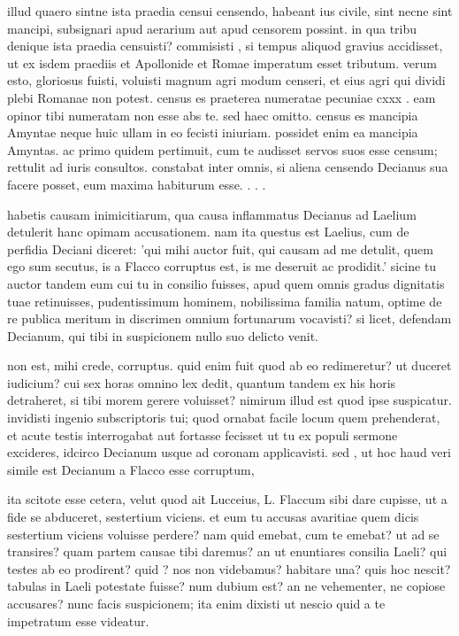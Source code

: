 illud quaero sintne ista praedia censui censendo, habeant ius civile, sint necne sint mancipi, subsignari apud aerarium aut apud censorem possint. in qua tribu denique ista praedia censuisti? commisisti , si tempus aliquod gravius accidisset, ut ex isdem praediis et Apollonide et Romae imperatum esset tributum. verum esto, gloriosus fuisti, voluisti magnum agri modum censeri, et eius agri qui dividi plebi Romanae non potest. census es praeterea numeratae pecuniae cxxx . eam opinor tibi numeratam non esse abs te. sed haec omitto. census es mancipia Amyntae neque huic ullam in eo fecisti iniuriam. possidet enim ea mancipia Amyntas. ac primo quidem pertimuit, cum te audisset servos suos esse censum; rettulit ad iuris consultos. constabat inter omnis, si aliena censendo Decianus sua facere posset, eum maxima habiturum esse. . . .

 habetis causam inimicitiarum, qua causa inflammatus Decianus ad Laelium detulerit hanc opimam accusationem. nam ita questus est Laelius, cum de perfidia Deciani diceret: 'qui mihi auctor fuit, qui causam ad me detulit, quem ego sum secutus, is a Flacco corruptus est, is me deseruit ac prodidit.' sicine tu auctor tandem eum cui tu in consilio fuisses, apud quem omnis gradus dignitatis tuae retinuisses, pudentissimum hominem, nobilissima familia natum, optime de re publica meritum in discrimen omnium fortunarum vocavisti? si licet, defendam Decianum, qui tibi in suspicionem nullo suo delicto venit.

 non est, mihi crede, corruptus. quid enim fuit quod ab eo redimeretur? ut duceret iudicium? cui sex horas omnino lex dedit, quantum tandem ex his horis detraheret, si tibi morem gerere voluisset? nimirum illud est quod ipse suspicatur. invidisti ingenio subscriptoris tui; quod ornabat facile locum quem prehenderat, et acute testis interrogabat aut fortasse fecisset ut tu ex populi sermone excideres, idcirco Decianum usque ad coronam applicavisti. sed , ut hoc haud veri simile est Decianum a Flacco esse corruptum,

 ita scitote esse cetera, velut quod ait Lucceius, L. Flaccum sibi dare cupisse, ut a fide se abduceret, sestertium viciens. et eum tu accusas avaritiae quem dicis sestertium viciens voluisse perdere? nam quid emebat, cum te emebat? ut ad se transires? quam partem causae tibi daremus? an ut enuntiares consilia Laeli? qui testes ab eo prodirent? quid ? nos non videbamus? habitare una? quis hoc nescit? tabulas in Laeli potestate fuisse? num dubium est? an ne vehementer, ne copiose accusares? nunc facis suspicionem; ita enim dixisti ut nescio quid a te impetratum esse videatur.

